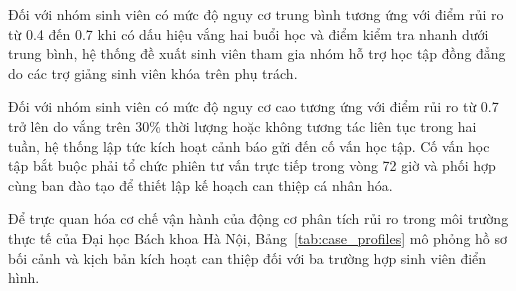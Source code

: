 Đối với nhóm sinh viên có mức độ nguy cơ trung bình tương ứng với điểm rủi ro từ 0.4 đến 0.7 khi có dấu hiệu vắng hai buổi học và điểm kiểm tra nhanh dưới trung bình, hệ thống đề xuất sinh viên tham gia nhóm hỗ trợ học tập đồng đẳng do các trợ giảng sinh viên khóa trên phụ trách. 

Đối với nhóm sinh viên có mức độ nguy cơ cao tương ứng với điểm rủi ro từ 0.7 trở lên do vắng trên 30\% thời lượng hoặc không tương tác liên tục trong hai tuần, hệ thống lập tức kích hoạt cảnh báo gửi đến cố vấn học tập. Cố vấn học tập bắt buộc phải tổ chức phiên tư vấn trực tiếp trong vòng 72 giờ và phối hợp cùng ban đào tạo để thiết lập kế hoạch can thiệp cá nhân hóa.

Để trực quan hóa cơ chế vận hành của động cơ phân tích rủi ro trong môi trường thực tế của Đại học Bách khoa Hà Nội, Bảng~\ref{tab:case_profiles} mô phỏng hồ sơ bối cảnh và kịch bản kích hoạt can thiệp đối với ba trường hợp sinh viên điển hình.

